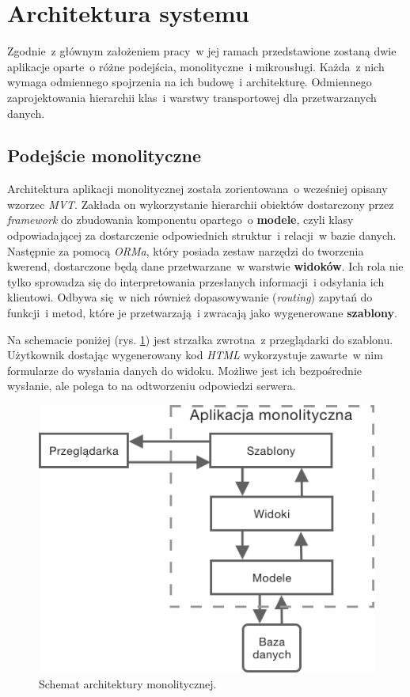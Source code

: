 \section{Architektura systemu}
Zgodnie~z głównym założeniem pracy~w jej ramach przedstawione zostaną dwie aplikacje oparte~o różne podejścia, monolityczne~i mikrousługi. Każda~z nich wymaga odmiennego spojrzenia na ich budowę~i architekturę. Odmiennego zaprojektowania hierarchii klas~i warstwy transportowej dla przetwarzanych danych.
\subsection{Podejście monolityczne}
Architektura aplikacji monolitycznej została zorientowana~o wcześniej opisany wzorzec \textit{MVT}. Zakłada on wykorzystanie hierarchii obiektów dostarczony przez \textit{framework} do zbudowania komponentu opartego~o \textbf{modele}, czyli klasy odpowiadającej za dostarczenie odpowiednich struktur~i relacji~w bazie danych. Następnie za pomocą \textit{ORMa}, który posiada zestaw narzędzi do tworzenia kwerend, dostarczone będą dane przetwarzane~w warstwie \textbf{widoków}. Ich rola nie tylko sprowadza się do interpretowania przesłanych informacji~i odsyłania ich klientowi. Odbywa się~w nich również dopasowywanie (\textit{routing}) zapytań do funkcji~i metod, które je przetwarzają~i zwracają jako wygenerowane \textbf{szablony}. 

Na schemacie poniżej (rys. \ref{fig:architekturaMono}) jest strzałka zwrotna~z przeglądarki do szablonu. Użytkownik dostając wygenerowany kod \textit{HTML} wykorzystuje zawarte~w nim formularze do wysłania danych do widoku. Możliwe jest ich bezpośrednie wysłanie, ale polega to na odtworzeniu odpowiedzi serwera.
\begin{figure}[h!]
	\centering
		\includegraphics[width=12cm]{Rysunki/Rozdzial3/architekturaMono}
		\caption{Schemat architektury monolitycznej.}	
		\label{fig:architekturaMono}
	\end{figure}

